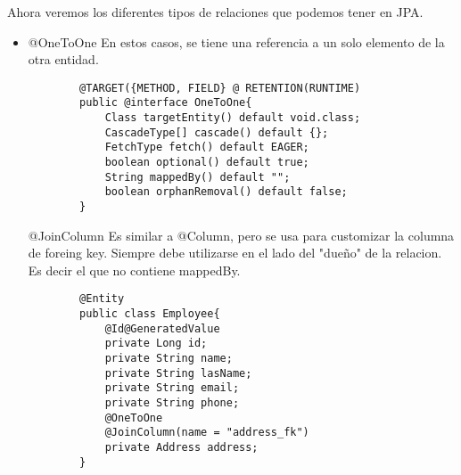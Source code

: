 \documentclass{article}
\begin{document}
Ahora veremos los diferentes tipos de relaciones que podemos tener en JPA.
\begin{itemize}
	\item @OneToOne
	      \subitem En estos casos, se tiene una referencia a un solo elemento de la otra entidad.
	      \begin{lstlisting}
        @TARGET({METHOD, FIELD} @ RETENTION(RUNTIME)
        public @interface OneToOne{
            Class targetEntity() default void.class;
            CascadeType[] cascade() default {};
            FetchType fetch() default EAGER;
            boolean optional() default true;
            String mappedBy() default "";
            boolean orphanRemoval() default false;
        }
    \end{lstlisting}
	      \subsubitem @JoinColumn
	      \subsubitem Es similar a @Column, pero se usa para customizar la columna de foreing key.
	      \subsubitem Siempre debe utilizarse en el lado del "dueño" de la relacion. Es decir el que no contiene mappedBy.
	      \begin{lstlisting}
        @Entity
        public class Employee{
            @Id@GeneratedValue
            private Long id;
            private String name;
            private String lasName; 
            private String email;
            private String phone;
            @OneToOne
            @JoinColumn(name = "address_fk")
            private Address address;
        }


\end{lstlisting}
\end{itemize}
\end{document}
